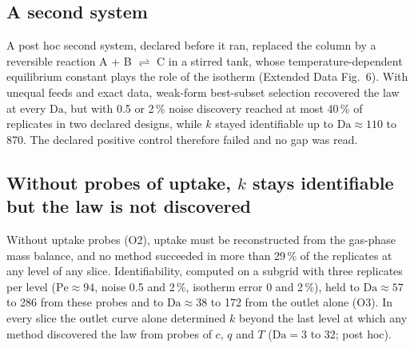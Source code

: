 \documentclass[11pt]{article}
\newcommand{\Da}{\mathrm{Da}}
\newcommand{\Pe}{\mathrm{Pe}}
\begin{document}
\subsection*{A second system}
A post hoc second system, declared before it ran, replaced the column by a reversible reaction
A + B $\rightleftharpoons$ C in a stirred tank, whose temperature-dependent equilibrium constant plays the
role of the isotherm (Extended Data Fig.~6). With unequal feeds and exact data, weak-form best-subset
selection recovered the law at every $\Da$, but with 0.5 or 2\,\% noise discovery reached at most
40\,\% of replicates in two declared designs, while $k$ stayed identifiable up to $\Da \approx 110$ to 870.
The declared positive control therefore failed and no gap was read.

\subsection*{Without probes of uptake, $k$ stays identifiable but the law is not discovered}
Without uptake probes (O2), uptake must be reconstructed from the gas-phase mass balance, and
no method succeeded in more than 29\,\% of the replicates at any level
of any slice.
Identifiability, computed on a subgrid with three replicates per level ($\Pe \approx 94$,
noise 0.5 and 2\,\%, isotherm error 0 and 2\,\%), held to $\Da \approx 57$ to 286
from these probes and to $\Da \approx 38$ to 172 from the outlet alone (O3). In every slice the
outlet curve alone determined $k$ beyond the last level at which any method discovered the law
from probes of $c$, $q$ and $T$ ($\Da = 3$ to 32; post hoc).
\end{document}
